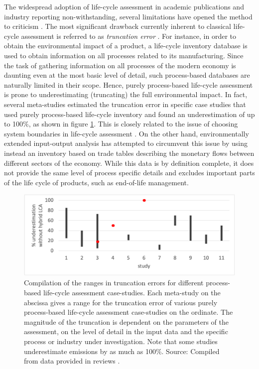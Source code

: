 \documentclass{article}
\begin{document}
    The widespread adoption of life-cycle assessment in academic publications and industry reporting non-withstanding, several limitations have opened the method to criticism \cite{reap_survey_2008}\cite{reap_survey_2008-1}\cite{finnveden_limitations_2000}\cite{plevin_using_2014}. The most significant drawback currently inherent to classical life-cycle assessment is referred to as \textit{truncation error} \cite{crawford_hybrid_2018}. For instance, in order to obtain the environmental impact of a product, a life-cycle inventory database is used to obtain information on all processes related to its manufacturing. Since the task of gathering information on all processes of the modern economy is daunting even at the most basic level of detail, such process-based databases are naturally limited in their scope. Hence, purely process-based life-cycle assessment is prone to underestimating (truncating) the full environmental impact. In fact, several meta-studies estimated the truncation error in specific case studies that used purely process-based life-cycle inventory and found an underestimation of up to 100\%, as shown in figure \ref{fig:underestimation}. This is closely related to the issue of choosing system boundaries in life-cycle assessment \cite{teh_hybrid_2017}. On the other hand, environmentally extended input-output analysis has attempted to circumvent this issue by using instead an inventory based on trade tables describing the monetary flows between different sectors of the economy. While this data is by definition complete, it does not provide the same level of process specific details and excludes important parts of the life cycle of products, such as end-of-life management.
    
    \begin{figure}[h!]
    	\centering
    	\includegraphics[width=\textwidth]{figures/underestimation_excel.png}
    	\caption{Compilation of the ranges in truncation errors for different process-based life-cycle assessment case-studies. Each meta-study on the abscissa gives a range for the truncation error of various purely process-based life-cycle assessment case-studies on the ordinate. The magnitude of the truncation is dependent on the parameters of the assessment, on the level of detail in the input data and the specific process or industry under investigation. Note that some studies underestimate emissions by as much as 100\%. Source: Compiled from data provided in reviews \cite{rebitzer_input-output_2002}\cite{lenzen_errors_2000}\cite{agez_hybridization_2020}\cite{agez_correcting_2022}\cite{agez_lifting_2019}.}
    	\label{fig:underestimation}
    \end{figure}
    
\end{document}
